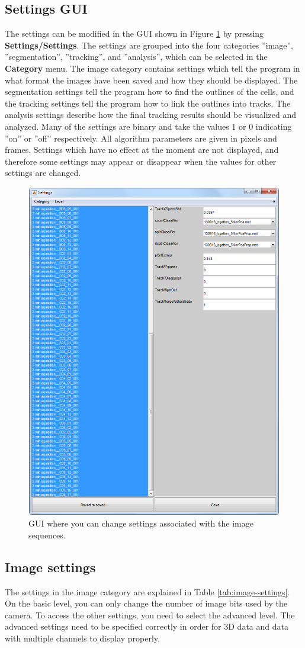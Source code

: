 \documentclass[a4paper, oneside, onecolumn, 11pt]{article}
\newcommand{\menu}[1]{\textbf{#1}}
\begin{document}
\subsection{Settings GUI}
The settings can be modified in the GUI shown in Figure \ref{fig:settings-GUI} by pressing \menu{Settings/\allowbreak Settings}. The settings are grouped into the four categories ''image'', ''segmentation'', ''tracking'', and ''analysis'', which can be selected in the \menu{Category} menu. The image category contains settings which tell the program in what format the images have been saved and how they should be displayed. The segmentation settings tell the program how to find the outlines of the cells, and the tracking settings tell the program how to link the outlines into tracks. The analysis settings describe how the final tracking results should be visualized and analyzed. Many of the settings are binary and take the values 1 or 0 indicating ''on'' or ''off'' respectively. All algorithm parameters are given in pixels and frames. Settings which have no effect at the moment are not displayed, and therefore some settings may appear or disappear when the values for other settings are changed.

\begin{figure}[!htb]
\begin{center}
\includegraphics[width = 0.5\columnwidth]{figures/settingsGUI}
\caption{GUI where you can change settings associated with the image sequences.}
\label{fig:settings-GUI}
\end{center}
\end{figure}

\subsection{Image settings}
The settings in the image category are explained in Table \ref{tab:image-settings}. On the basic level, you can only change the number of image bits used by the camera. To access the other settings, you need to select the advanced level. The advanced settings need to be specified correctly in order for 3D data and data with multiple channels to display properly.
\end{document}
